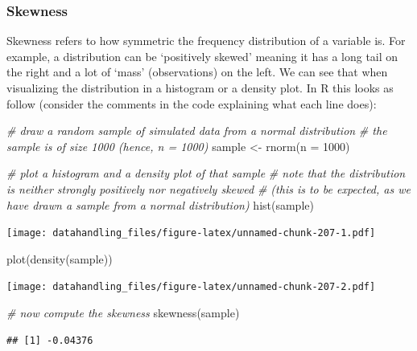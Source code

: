 \documentclass[
  12pt,
]{style/krantz}
\newenvironment{Shaded}{\begin{snugshade}}{\end{snugshade}}
\newcommand{\AttributeTok}[1]{\textcolor[rgb]{0.77,0.63,0.00}{#1}}
\newcommand{\CommentTok}[1]{\textcolor[rgb]{0.56,0.35,0.01}{\textit{#1}}}
\newcommand{\DecValTok}[1]{\textcolor[rgb]{0.00,0.00,0.81}{#1}}
\newcommand{\FunctionTok}[1]{\textcolor[rgb]{0.00,0.00,0.00}{#1}}
\newcommand{\NormalTok}[1]{#1}
\newcommand{\OtherTok}[1]{\textcolor[rgb]{0.56,0.35,0.01}{#1}}
\begin{document}
\hypertarget{skewness}{%
\subsubsection{Skewness}\label{skewness}}

Skewness refers to how symmetric the frequency distribution of a variable is. For example, a distribution can be `positively skewed' meaning it has a long tail on the right and a lot of `mass' (observations) on the left. We can see that when visualizing the distribution in a histogram or a density plot. In R this looks as follow (consider the comments in the code explaining what each line does):

\begin{Shaded}
\begin{Highlighting}[]
\CommentTok{\# draw a random sample of simulated data from a normal distribution}
\CommentTok{\# the sample is of size 1000 (hence, n = 1000)}
\NormalTok{sample }\OtherTok{\textless{}{-}} \FunctionTok{rnorm}\NormalTok{(}\AttributeTok{n =} \DecValTok{1000}\NormalTok{)}

\CommentTok{\# plot a histogram and a density plot of that sample}
\CommentTok{\# note that the distribution is neither strongly positively nor negatively skewed}
\CommentTok{\# (this is to be expected, as we have drawn a sample from a normal distribution)}
\FunctionTok{hist}\NormalTok{(sample)}
\end{Highlighting}
\end{Shaded}

\texttt{[image: datahandling\_files/figure-latex/unnamed-chunk-207-1.pdf]}

\begin{Shaded}
\begin{Highlighting}[]
\FunctionTok{plot}\NormalTok{(}\FunctionTok{density}\NormalTok{(sample))}
\end{Highlighting}
\end{Shaded}

\texttt{[image: datahandling\_files/figure-latex/unnamed-chunk-207-2.pdf]}

\begin{Shaded}
\begin{Highlighting}[]
\CommentTok{\# now compute the skewness}
\FunctionTok{skewness}\NormalTok{(sample)}
\end{Highlighting}
\end{Shaded}

\begin{verbatim}
## [1] -0.04376
\end{verbatim}
\end{document}
